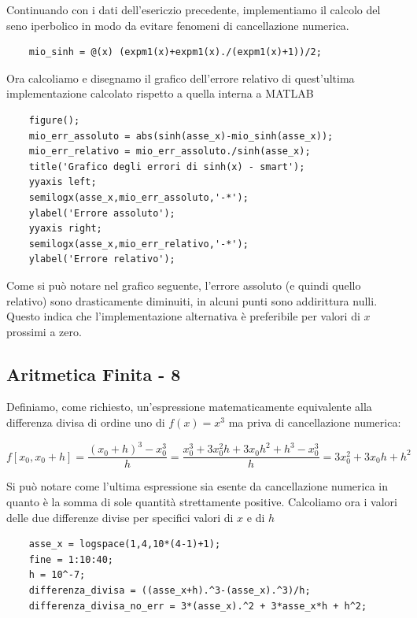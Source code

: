 \documentclass{article}
\begin{document}
Continuando con i dati dell'esericzio precedente, implementiamo il calcolo del seno iperbolico in modo da evitare fenomeni di cancellazione numerica.

\begin{lstlisting}
	mio_sinh = @(x) (expm1(x)+expm1(x)./(expm1(x)+1))/2;
\end{lstlisting}

Ora calcoliamo e disegnamo il grafico dell'errore relativo di quest'ultima implementazione calcolato rispetto a quella interna a MATLAB

\begin{lstlisting}
	figure();
	mio_err_assoluto = abs(sinh(asse_x)-mio_sinh(asse_x));
	mio_err_relativo = mio_err_assoluto./sinh(asse_x);
	title('Grafico degli errori di sinh(x) - smart');
	yyaxis left;
	semilogx(asse_x,mio_err_assoluto,'-*');
	ylabel('Errore assoluto');
	yyaxis right;
	semilogx(asse_x,mio_err_relativo,'-*');
	ylabel('Errore relativo');
\end{lstlisting}

Come si può notare nel grafico seguente, l'errore assoluto (e quindi quello relativo) sono drasticamente diminuiti, in alcuni punti sono addirittura nulli. Questo indica che l'implementazione alternativa è preferibile per valori di $x$ prossimi a zero.



\clearpage
\subsection*{Aritmetica Finita - 8}

Definiamo, come richiesto, un'espressione matematicamente equivalente alla differenza divisa di ordine uno di $f\left(x\right)=x^3$ ma priva di cancellazione numerica:

\begin{equation*}
	f[x_0,x_0+h]
	=\frac{{(x_0 +h)}^3 -x_0^3}{h}
	=\frac{x_0^3+3x_0^2 h+3x_0 h^2 +h^3 -x_0^3}{h}
	=3x_0^2 +3x_0 h+h^2
\end{equation*}

Si può notare come l'ultima espressione sia esente da cancellazione numerica in quanto è la somma di sole quantità strettamente positive. Calcoliamo ora i valori delle due differenze divise per specifici valori di $x$ e di $h$

\begin{lstlisting}
	asse_x = logspace(1,4,10*(4-1)+1);
	fine = 1:10:40;
	h = 10^-7;
	differenza_divisa = ((asse_x+h).^3-(asse_x).^3)/h;
	differenza_divisa_no_err = 3*(asse_x).^2 + 3*asse_x*h + h^2;
\end{lstlisting}
\end{document}
